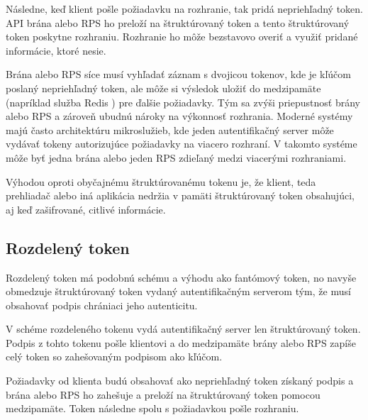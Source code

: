 Následne, keď klient pošle požiadavku na rozhranie, tak pridá nepriehľadný token. API brána alebo RPS ho preloží na štruktúrovaný token a tento štruktúrovaný token poskytne rozhraniu. Rozhranie ho môže bezstavovo overiť a využiť pridané informácie, ktoré nesie.

Brána alebo RPS síce musí vyhľadať záznam s dvojicou tokenov, kde je kľúčom poslaný nepriehľadný token, ale môže si výsledok uložiť do medzipamäte (napríklad služba Redis \cite{redis}) pre ďalšie požiadavky. Tým sa zvýši priepustnosť brány alebo RPS a zároveň ubudnú nároky na výkonnosť rozhrania. Moderné systémy majú často architektúru mikroslužieb, kde jeden autentifikačný server môže vydávať tokeny autorizujúce požiadavky na viacero rozhraní. V takomto systéme môže byť jedna brána alebo jeden RPS zdieľaný medzi viacerými rozhraniami.

Výhodou oproti obyčajnému štruktúrovanému tokenu je, že klient, teda prehliadač alebo iná aplikácia nedržia v pamäti štruktúrovaný token obsahujúci, aj keď zašifrované, citlivé informácie.


\subsection{Rozdelený token}

Rozdelený token \cite{split_token} má podobnú schému a výhodu ako fantómový token, no navyše obmedzuje štruktúrovaný token vydaný autentifikačným serverom tým, že musí obsahovať podpis chrániaci jeho autenticitu.

V schéme rozdeleného tokenu vydá autentifikačný server len štruktúrovaný token. Podpis z tohto tokenu pošle klientovi a do medzipamäte brány alebo RPS zapíše celý token so zahešovaným podpisom ako kľúčom.

Požiadavky od klienta budú obsahovať ako nepriehľadný token získaný podpis a brána alebo RPS ho zahešuje a preloží na štruktúrovaný token pomocou medzipamäte. Token následne spolu s požiadavkou pošle rozhraniu.